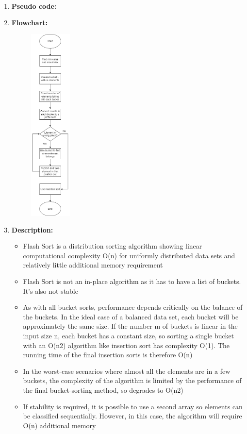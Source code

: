 \documentclass[11pt,a4paper]{article}
\begin{document}
{\begin{enumerate}[label=\textbf{\arabic*})]
				\item \textbf{Pseudo code:} 
				\pagebreak
				\item \textbf{Flowchart:}
					\begin{figure}[H]
						\centering 
						\includegraphics[width=0.2\textwidth]{FlashSortFlowchart}
					\end{figure}
					
				\item \textbf{Description:}
					\begin{itemize}
						\item Flash Sort is a distribution sorting algorithm showing linear computational complexity O(n) for uniformly distributed data sets and relatively little additional memory requirement
						\item Flash Sort is not an in-place algorithm as it has to have a list of buckets. It’s also not stable
						\item As with all bucket sorts, performance depends critically on the balance of the buckets. In the ideal case of a balanced data set, each bucket will be approximately the same size. If the number m of buckets is linear in the input size n, each bucket has a constant size, so sorting a single bucket with an O(n2) algorithm like insertion sort has complexity O(1). The running time of the final insertion sorts is therefore O(n)
						\item In the worst-case scenarios where almost all the elements are in a few buckets, the complexity of the algorithm is limited by the performance of the final bucket-sorting method, so degrades to O(n2)
						\item If stability is required, it is possible to use a second array so elements can be classified sequentially. However, in this case, the algorithm will require O(n) additional memory
					\end{itemize}
				

\end{enumerate}}
\end{document}
